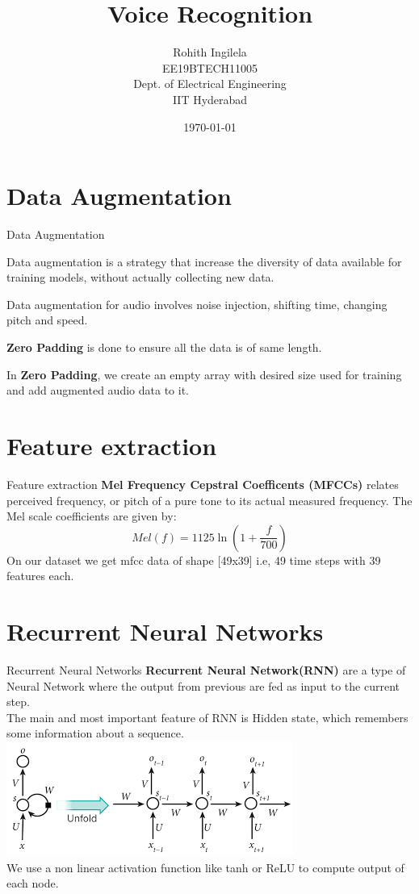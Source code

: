 \documentclass{beamer}
\title{Voice Recognition}
\author{ Rohith Ingilela \\ EE19BTECH11005 \\ Dept. of Electrical Engineering \\ IIT Hyderabad}
\date{\today}
\theoremstyle{remark}
\numberwithin{equation}{section}
\begin{document}
\begin{frame}
\titlepage
\end{frame}
\begin{frame}
\tableofcontents
\end{frame}
\section{Data Augmentation}
\begin{frame}{Data Augmentation}
\begin{description}[font=$\bullet$~\normalfont\scshape\color{red!50!black}]
\item [] Data augmentation is a strategy that increase the diversity of data available for training models, without actually collecting new data.
\item [] Data augmentation for audio involves noise injection, shifting time, changing pitch and speed. 
\item [] \textbf{Zero Padding} is done to ensure all the data is of same length.
\item [] In \textbf{Zero Padding}, we create an empty array with desired size used for training and add augmented audio data to it.
\end{description}
\end{frame}
\section{Feature extraction}
\begin{frame}{Feature extraction}
\textbf{Mel Frequency Cepstral Coefficents (MFCCs)} relates perceived frequency, or pitch of a pure tone to its actual measured frequency. The Mel scale coefficients are given by:
\begin{equation*}
     Mel(f) = 1125\ln({1 + \frac{f}{700}})
 \end{equation*}
 On our dataset we get mfcc data of shape [49x39] i.e, 49 time steps with 39 features each.
\end{frame}
\section{Recurrent Neural Networks}
\begin{frame}{Recurrent Neural Networks}
\textbf{Recurrent Neural Network(RNN)} are a type of Neural Network where the output from previous are fed as input to the current step. \\ The main and most important feature of RNN is Hidden state, which remembers some information about a sequence. \\
\includegraphics[width=0.5\columnwidth]{./figs/rnn_img.png} \\
We use a non linear activation function like tanh or ReLU to compute output of each node. \\
\end{frame}
\end{document}

